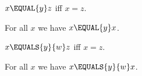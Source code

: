 \begin{abbreviation}\label{abbr_equal}
    $x\EQUAL{y} z$ iff $x = z$.
\end{abbreviation}

\begin{proposition}\label{dummy_abbr_test}
    For all $x$ we have $x\EQUAL{y}x$.
\end{proposition}

\begin{abbreviation}\label{defn_equals}
    $x\EQUALS{y}{w} z$ iff $x = z$.
\end{abbreviation}

\begin{proposition}\label{dummy_defn_test}
    For all $x$ we have $x\EQUALS{y}{w}x$.
\end{proposition}
